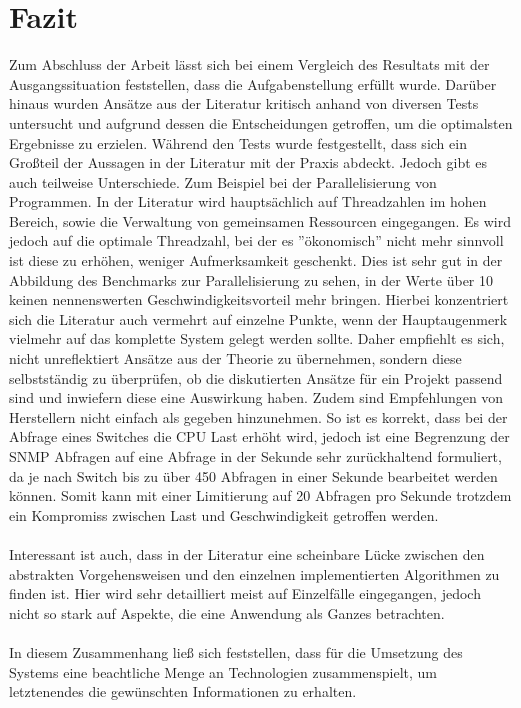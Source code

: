 \chapter{Fazit}
\label{cha:Fazit}

Zum Abschluss der Arbeit lässt sich bei einem Vergleich des Resultats mit der Ausgangssituation feststellen, dass die Aufgabenstellung erfüllt wurde.
Darüber hinaus wurden Ansätze aus der Literatur kritisch anhand von diversen Tests untersucht und aufgrund dessen die Entscheidungen getroffen, um die optimalsten Ergebnisse zu erzielen.
Während den Tests wurde festgestellt, dass sich ein Großteil der Aussagen in der Literatur mit der Praxis abdeckt. Jedoch gibt es auch teilweise Unterschiede.
Zum Beispiel bei der Parallelisierung von Programmen. In der Literatur wird hauptsächlich auf Threadzahlen im hohen Bereich, sowie die Verwaltung von gemeinsamen Ressourcen eingegangen.
Es wird jedoch auf die optimale Threadzahl, bei der es ''ökonomisch'' nicht mehr sinnvoll ist diese zu erhöhen, weniger Aufmerksamkeit geschenkt.
Dies ist sehr gut in der Abbildung des Benchmarks zur Parallelisierung zu sehen, in der Werte über 10 keinen nennenswerten Geschwindigkeitsvorteil mehr bringen.
Hierbei konzentriert sich die Literatur auch vermehrt auf einzelne Punkte, wenn der Hauptaugenmerk vielmehr auf das komplette System gelegt werden sollte.
Daher empfiehlt es sich, nicht unreflektiert Ansätze aus der Theorie zu übernehmen, sondern diese selbstständig zu überprüfen, ob die diskutierten Ansätze für ein Projekt passend sind und inwiefern diese eine Auswirkung haben.
Zudem sind Empfehlungen von Herstellern nicht einfach als gegeben hinzunehmen.
So ist es korrekt, dass bei der Abfrage eines Switches die CPU Last erhöht wird, jedoch ist eine Begrenzung der SNMP Abfragen auf eine Abfrage in der Sekunde sehr zurückhaltend formuliert, da je nach Switch bis zu über 450 Abfragen in einer Sekunde bearbeitet werden können. Somit kann mit einer Limitierung auf 20 Abfragen pro Sekunde trotzdem ein Kompromiss zwischen Last und Geschwindigkeit getroffen werden.\\\\
Interessant ist auch, dass in der Literatur eine scheinbare Lücke zwischen den abstrakten Vorgehensweisen und den einzelnen implementierten Algorithmen zu finden ist.
Hier wird sehr detailliert meist auf Einzelfälle eingegangen, jedoch nicht so stark auf Aspekte, die eine Anwendung als Ganzes betrachten.\\\\
In diesem Zusammenhang ließ sich feststellen, dass für die Umsetzung des Systems eine beachtliche Menge an Technologien zusammenspielt, um letztenendes die gewünschten Informationen zu erhalten.
